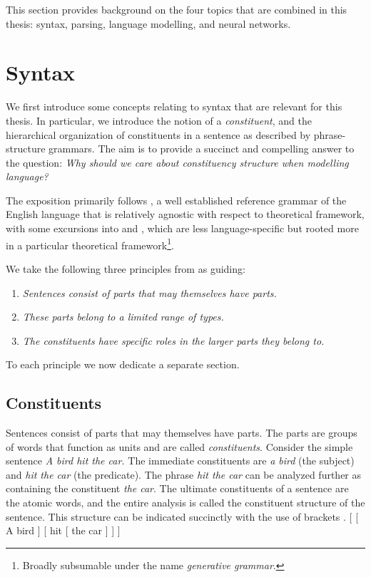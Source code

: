 This section provides background on the four topics that are combined in this thesis: syntax, parsing, language modelling, and neural networks.

\section{Syntax}
We first introduce some concepts relating to syntax that are relevant for this thesis. In particular, we introduce the notion of a \textit{constituent}, and the hierarchical organization of constituents in a sentence as described by phrase-structure grammars. The aim is to provide a succinct and compelling answer to the question: \textit{Why should we care about constituency structure when modelling language?}

The exposition primarily follows \citet{huddleston2002grammar}, a well established reference grammar of the English language that is relatively agnostic with respect to theoretical framework, with some excursions into \citet{carnie2010constituent} and \citet{everaert2015structures}, which are less language-specific but rooted more in a particular theoretical framework\footnote{Broadly subsumable under the name \textit{generative grammar}.}.

We take the following three principles from \citet{huddleston2002grammar} as guiding:
\begin{enumerate}[noitemsep]
  \item \textit{Sentences consist of parts that may themselves have parts.}
  \item \textit{These parts belong to a limited range of types.}
  \item \textit{The constituents have specific roles in the larger parts they belong to.}
\end{enumerate}
To each principle we now dedicate a separate section.

\subsection{Constituents}
Sentences consist of parts that may themselves have parts. The parts are groups of words that function as units and are called \textit{constituents}. Consider the simple sentence \textit{A bird hit the car.} The immediate constituents are \textit{a bird} (the subject) and \textit{hit the car} (the predicate). The phrase \textit{hit the car} can be analyzed further as containing the constituent \textit{the car}. The ultimate constituents of a sentence are the atomic words, and the entire analysis is called the constituent structure of the sentence. This structure can be indicated succinctly with the use of brackets
\exi. [ [ A bird ] [ hit [ the car ] ] ]

